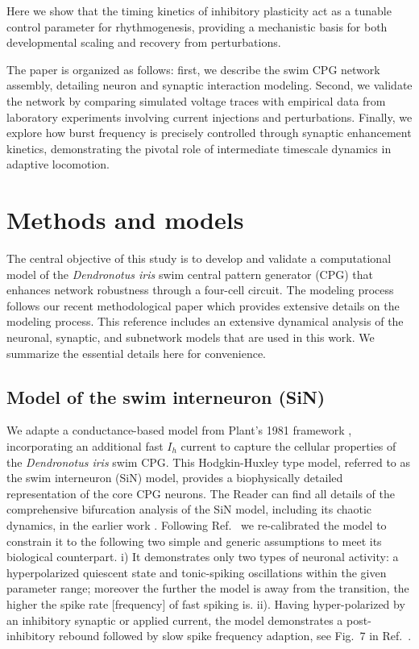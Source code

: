 \documentclass[nofootinbib,aip,amsmath,amssymb,reprint,twocolumn,10pt]{revtex4-2}
\begin{document}
Here we show that the timing kinetics of inhibitory plasticity act as a tunable control parameter for rhythmogenesis, providing a mechanistic basis for both developmental scaling and recovery from perturbations.

The paper is organized as follows: first, we describe the swim CPG network assembly, detailing neuron and synaptic interaction modeling. Second, we validate the network by comparing simulated voltage traces with empirical data from laboratory experiments involving current injections and perturbations.
Finally, we explore how burst frequency is precisely controlled through synaptic enhancement kinetics, demonstrating the pivotal role of intermediate timescale dynamics in adaptive locomotion.

\section{Methods and models}
%
The central objective of this study is to develop and validate a computational model of the \textit{Dendronotus iris} swim central pattern generator (CPG) that enhances network robustness through a four-cell circuit.
The modeling process follows our recent methodological paper \cite{scully2024pairing} which provides extensive details on the modeling process.
This reference includes an extensive dynamical analysis of the neuronal, synaptic, and subnetwork models that are used in this work. We summarize the essential details here for convenience.

\subsection{Model of the swim interneuron (SiN)}
%
We adapte a conductance-based model from Plant's 1981 framework \cite{plant81,scully2024pairing} \cite{Alacam2015}, incorporating an additional fast $I_h$ current to capture the cellular properties of the \textit{Dendronotus iris} swim CPG. This Hodgkin-Huxley type model, referred to as the swim interneuron (SiN) model, provides a biophysically detailed representation of the core CPG neurons. The Reader can find all details of the  comprehensive bifurcation analysis of the SiN model, including its chaotic dynamics, in the earlier work \cite{scully2024chaos}. Following Ref.~\cite{scully2024chaos} we re-calibrated the model to constrain it to the following two simple and generic assumptions to meet its biological counterpart.  i) It demonstrates only two types of neuronal activity: a hyperpolarized quiescent state and tonic-spiking oscillations within the given parameter range; moreover the further the model is away from the transition, the higher the spike rate [frequency] of fast spiking is. ii). Having hyper-polarized by an inhibitory synaptic or applied current, the model demonstrates a post-inhibitory rebound followed by slow spike frequency adaption, see Fig.~7 in Ref.~\cite{scully2024pairing}.      
\end{document}
